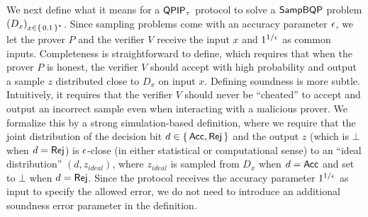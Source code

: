 We next define what it means for a $\operatorname{\mathsf{QPIP}}_\tau$ protocol to solve a $\operatorname{\mathsf{SampBQP}}$ problem $\left(D_x\right)_{x\in\set{0, 1}^*}$.
Since sampling problems come with an accuracy parameter $\epsilon$, we let the prover $P$ and the verifier $V$ receive the input $x$ and $1^{1/\epsilon}$ as common inputs. 
Completeness is straightforward to define, which requires that when the prover $P$ is honest, the verifier $V$ should accept with high probability and output a sample $z$ distributed close to $D_x$ on input $x$. Defining soundness is more subtle. Intuitively, it requires that the verifier $V$ should never be ``cheated'' to accept and output an incorrect sample even when interacting with a malicious prover. We formalize this by a strong simulation-based definition, where we require that the joint distribution of the decision bit $d \in \set{\mathsf{Acc}, \mathsf{Rej}}$ and the output $z$ (which is $\bot$ when $d = \mathsf{Rej}$) is $\epsilon$-close (in either statistical or computational sense) to an ``ideal distribution'' $(d,z_{ideal})$, where $z_{ideal}$ is sampled from $D_x$ when $d = \mathsf{Acc}$ and set to $\bot$ when $d = \mathsf{Rej}$. Since the protocol receives the accuracy parameter $1^{1/\epsilon}$ as input to specify the allowed error, we do not need to introduce an additional soundness error parameter in the definition.

